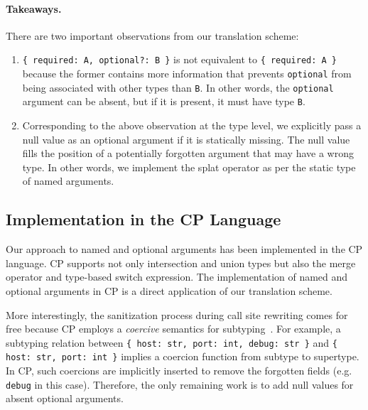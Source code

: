 \paragraph{Takeaways.}
There are two important observations from our translation scheme:
\begin{enumerate}
\item \lstinline|{ required: A, optional?: B }| is not equivalent to
      \lstinline|{ required: A }| because the former contains more information
      that prevents \lstinline{optional} from being associated with other types
      than \lstinline{B}. In other words, the \lstinline{optional} argument can
      be absent, but if it is present, it must have type \lstinline{B}.
\item Corresponding to the above observation at the type level, we explicitly
      pass a null value as an optional argument if it is statically missing. The
      null value fills the position of a potentially forgotten argument that may
      have a wrong type. In other words, we implement the splat operator as per
      the static type of named arguments.
\end{enumerate}

\subsection{Implementation in the CP Language}

Our approach to named and optional arguments has been implemented in the CP
language. CP supports not only intersection and union types but also the merge
operator and type-based switch expression. The implementation of named and
optional arguments in CP is a direct application of our translation scheme.

More interestingly, the sanitization process during call site rewriting comes
for free because CP employs a \emph{coercive} semantics for
subtyping~\citep{luo2013coercive}. For example, a subtyping relation between
\lstinline[language={[3]Python}]|{ host: str, port: int, debug: str }| and
\lstinline[language={[3]Python}]|{ host: str, port: int }| implies a coercion
function from subtype to supertype. In CP, such coercions are implicitly
inserted to remove the forgotten fields (e.g. \lstinline{debug} in this case).
Therefore, the only remaining work is to add null values for absent optional
arguments.


